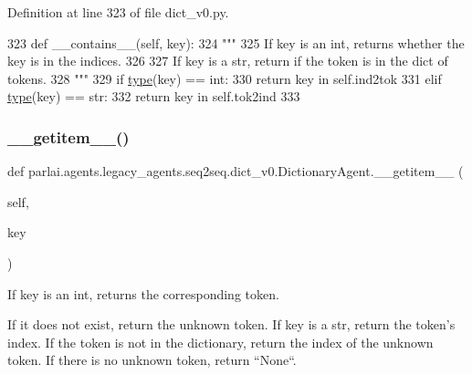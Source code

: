 Definition at line 323 of file dict\+\_\+v0.\+py.


\begin{DoxyCode}
323     \textcolor{keyword}{def }\_\_contains\_\_(self, key):
324         \textcolor{stringliteral}{"""}
325 \textcolor{stringliteral}{        If key is an int, returns whether the key is in the indices.}
326 \textcolor{stringliteral}{}
327 \textcolor{stringliteral}{        If key is a str, return if the token is in the dict of tokens.}
328 \textcolor{stringliteral}{        """}
329         \textcolor{keywordflow}{if} \hyperlink{namespaceparlai_1_1agents_1_1tfidf__retriever_1_1build__tfidf_ad5dfae268e23f506da084a9efb72f619}{type}(key) == int:
330             \textcolor{keywordflow}{return} key \textcolor{keywordflow}{in} self.ind2tok
331         \textcolor{keywordflow}{elif} \hyperlink{namespaceparlai_1_1agents_1_1tfidf__retriever_1_1build__tfidf_ad5dfae268e23f506da084a9efb72f619}{type}(key) == str:
332             \textcolor{keywordflow}{return} key \textcolor{keywordflow}{in} self.tok2ind
333 
\end{DoxyCode}
\mbox{\label{classparlai_1_1agents_1_1legacy__agents_1_1seq2seq_1_1dict__v0_1_1DictionaryAgent_a09fc8bfa07769eaa59f5d7b7fef95b72}} 
\subsubsection{\texorpdfstring{\+\_\+\+\_\+getitem\+\_\+\+\_\+()}{\_\_getitem\_\_()}}
{\footnotesize\ttfamily def parlai.\+agents.\+legacy\+\_\+agents.\+seq2seq.\+dict\+\_\+v0.\+Dictionary\+Agent.\+\_\+\+\_\+getitem\+\_\+\+\_\+ (\begin{DoxyParamCaption}\item[{}]{self,  }\item[{}]{key }\end{DoxyParamCaption})}

\begin{DoxyVerb}If key is an int, returns the corresponding token.

If it does not exist, return the unknown token. If key is a str, return the
token's index. If the token is not in the dictionary, return the index of the
unknown token. If there is no unknown token, return ``None``.
\end{DoxyVerb}
 

